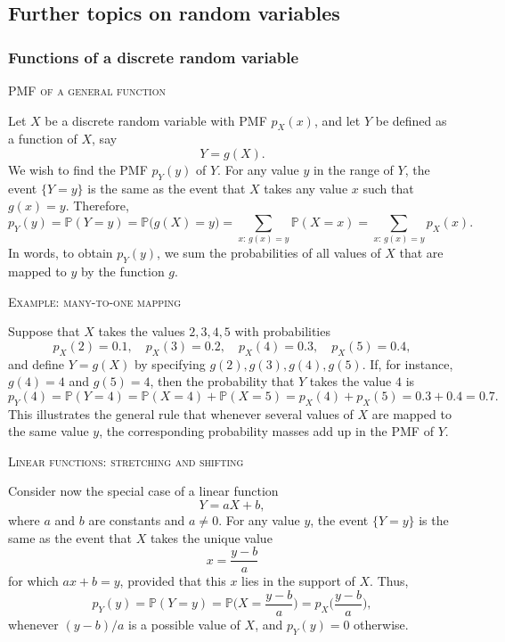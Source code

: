 \subsection{Further topics on random variables}


\subsubsection{Functions of a discrete random variable}

\textsc{PMF of a general function}

Let \(X\) be a discrete random variable with PMF \(p_X(x)\), and let \(Y\) be defined as a function of \(X\), say
\[
Y = g(X).
\]
We wish to find the PMF \(p_Y(y)\) of \(Y\).  
For any value \(y\) in the range of \(Y\), the event \(\{Y = y\}\) is the same as the event that \(X\) takes any value \(x\) such that \(g(x) = y\).  
Therefore,
\[
p_Y(y)
=
\mathbb{P}(Y = y)
=
\mathbb{P}\big(g(X) = y\big)
=
\sum_{x :\, g(x) = y} \mathbb{P}(X = x)
=
\sum_{x :\, g(x) = y} p_X(x).
\]
In words, to obtain \(p_Y(y)\), we sum the probabilities of all values of \(X\) that are mapped to \(y\) by the function \(g\).

\textsc{Example: many-to-one mapping}

Suppose that \(X\) takes the values \(2,3,4,5\) with probabilities
\[
p_X(2) = 0.1,
\quad
p_X(3) = 0.2,
\quad
p_X(4) = 0.3,
\quad
p_X(5) = 0.4,
\]
and define \(Y = g(X)\) by specifying \(g(2), g(3), g(4), g(5)\).  
If, for instance, \(g(4) = 4\) and \(g(5) = 4\), then the probability that \(Y\) takes the value \(4\) is
\[
p_Y(4)
=
\mathbb{P}(Y = 4)
=
\mathbb{P}(X = 4) + \mathbb{P}(X = 5)
=
p_X(4) + p_X(5)
=
0.3 + 0.4
=
0.7.
\]
This illustrates the general rule that whenever several values of \(X\) are mapped to the same value \(y\), the corresponding probability masses add up in the PMF of \(Y\).

\textsc{Linear functions: stretching and shifting}

Consider now the special case of a linear function
\[
Y = aX + b,
\]
where \(a\) and \(b\) are constants and \(a \ne 0\).  
For any value \(y\), the event \(\{Y = y\}\) is the same as the event that \(X\) takes the unique value
\[
x = \frac{y - b}{a}
\]
for which \(a x + b = y\), provided that this \(x\) lies in the support of \(X\).  
Thus,
\[
p_Y(y)
=
\mathbb{P}(Y = y)
=
\mathbb{P}\Big(X = \frac{y - b}{a}\Big)
=
p_X\Big(\frac{y - b}{a}\Big),
\]
whenever \((y - b)/a\) is a possible value of \(X\), and \(p_Y(y) = 0\) otherwise.


